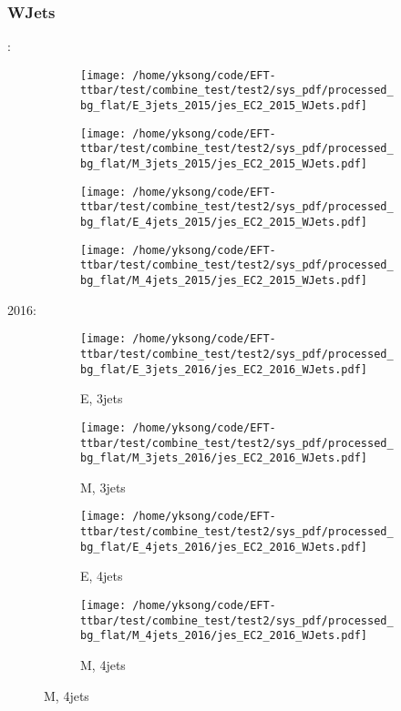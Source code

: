 \documentclass{beamer}
\begin{document}
\begin{frame}
\frametitle{WJets}
\fontsize{5}{1}:
\begin{figure}
\centering
\begin{subfigure}[b]{0.24\textwidth}
\texttt{[image: /home/yksong/code/EFT-ttbar/test/combine\_test/test2/sys\_pdf/processed\_bg\_flat/E\_3jets\_2015/jes\_EC2\_2015\_WJets.pdf]}
\end{subfigure}
\begin{subfigure}[b]{0.24\textwidth}
\texttt{[image: /home/yksong/code/EFT-ttbar/test/combine\_test/test2/sys\_pdf/processed\_bg\_flat/M\_3jets\_2015/jes\_EC2\_2015\_WJets.pdf]}
\end{subfigure}
\begin{subfigure}[b]{0.24\textwidth}
\texttt{[image: /home/yksong/code/EFT-ttbar/test/combine\_test/test2/sys\_pdf/processed\_bg\_flat/E\_4jets\_2015/jes\_EC2\_2015\_WJets.pdf]}
\end{subfigure}
\begin{subfigure}[b]{0.24\textwidth}
\texttt{[image: /home/yksong/code/EFT-ttbar/test/combine\_test/test2/sys\_pdf/processed\_bg\_flat/M\_4jets\_2015/jes\_EC2\_2015\_WJets.pdf]}
\end{subfigure}
\end{figure}
2016:
\begin{figure}
\centering
\begin{subfigure}[b]{0.24\textwidth}
\texttt{[image: /home/yksong/code/EFT-ttbar/test/combine\_test/test2/sys\_pdf/processed\_bg\_flat/E\_3jets\_2016/jes\_EC2\_2016\_WJets.pdf]}
\captionsetup{font=tiny}
\caption{E, 3jets}
\end{subfigure}
\begin{subfigure}[b]{0.24\textwidth}
\texttt{[image: /home/yksong/code/EFT-ttbar/test/combine\_test/test2/sys\_pdf/processed\_bg\_flat/M\_3jets\_2016/jes\_EC2\_2016\_WJets.pdf]}
\captionsetup{font=tiny}
\caption{M, 3jets}
\end{subfigure}
\begin{subfigure}[b]{0.24\textwidth}
\texttt{[image: /home/yksong/code/EFT-ttbar/test/combine\_test/test2/sys\_pdf/processed\_bg\_flat/E\_4jets\_2016/jes\_EC2\_2016\_WJets.pdf]}
\captionsetup{font=tiny}
\caption{E, 4jets}
\end{subfigure}
\begin{subfigure}[b]{0.24\textwidth}
\texttt{[image: /home/yksong/code/EFT-ttbar/test/combine\_test/test2/sys\_pdf/processed\_bg\_flat/M\_4jets\_2016/jes\_EC2\_2016\_WJets.pdf]}
\captionsetup{font=tiny}
\caption{M, 4jets}
\end{subfigure}
\end{figure}
\end{frame}
\end{document}
